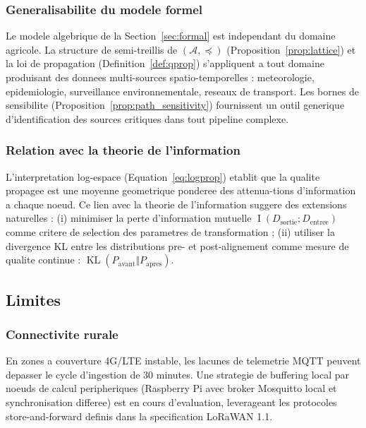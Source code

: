 \documentclass[12pt,a4paper]{article}
\theoremstyle{plain}
\theoremstyle{definition}
\theoremstyle{remark}
\DeclareMathOperator{\KL}{KL}
\DeclareMathOperator{\MI}{I}
\begin{document}
	\subsubsection{Generalisabilite du modele formel}
	
	Le modele algebrique de la Section~\ref{sec:formal} est independant
	du domaine agricole. La structure de semi-treillis de $(\mathcal{A},\preceq)$
	(Proposition~\ref{prop:lattice}) et la loi de propagation
	(Definition~\ref{def:qprop}) s'appliquent a tout domaine produisant
	des donnees multi-sources spatio-temporelles : meteorologie, epidemiologie,
	surveillance environnementale, reseaux de transport. Les bornes de
	sensibilite (Proposition~\ref{prop:path_sensitivity}) fournissent
	un outil generique d'identification des sources critiques dans tout
	pipeline complexe.
	
	\subsubsection{Relation avec la theorie de l'information}
	
	L'interpretation log-espace (Equation~\ref{eq:logprop}) etablit que
	la qualite propagee est une moyenne geometrique ponderee des attenua-tions
	d'information a chaque noeud. Ce lien avec la theorie de l'information
	\cite{shannon_info} suggere des extensions naturelles : (i) minimiser
	la perte d'information mutuelle $\MI(D_{\text{sortie}} ; D_{\text{entree}})$
	comme critere de selection des parametres de transformation ;
	(ii) utiliser la divergence KL entre les distributions pre- et
	post-alignement comme mesure de qualite continue :
	$\KL(P_{\text{avant}} \Vert P_{\text{apres}})$.
	
	\subsection{Limites}
	
	\subsubsection{Connectivite rurale}
	
	En zones a couverture 4G/LTE instable, les lacunes de telemetrie MQTT
	peuvent depasser le cycle d'ingestion de 30 minutes. Une strategie
	de buffering local par noeuds de calcul peripheriques (Raspberry Pi
	avec broker Mosquitto local et synchronisation differee) est en cours
	d'evaluation, leverageant les protocoles store-and-forward definis
	dans la specification LoRaWAN 1.1.
	
\end{document}
